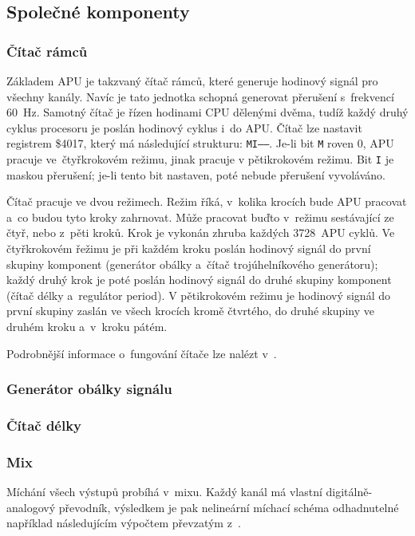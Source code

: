 \subsection{Společné komponenty}
\subsubsection{Čítač rámců}
\label{sec:analyza-citac-ramcu}
Základem APU je takzvaný čítač rámců, které generuje hodinový signál pro všechny kanály. Navíc je tato jednotka schopná generovat přerušení s~frekvencí 60~Hz. Samotný čítač je řízen hodinami CPU dělenými dvěma, tudíž každý druhý cyklus procesoru je poslán hodinový cyklus i~do APU. Čítač lze nastavit registrem \$4017, který má následující strukturu: \texttt{MI------}. Je-li bit \texttt{M} roven 0, APU pracuje ve~čtyřkrokovém režimu, jinak pracuje v pětikrokovém režimu. Bit \texttt{I} je maskou přerušení; je-li tento bit nastaven, poté nebude přerušení vyvoláváno.~\cite{Nesdev:apu-frame-counter}

Čítač pracuje ve dvou režimech. Režim říká, v~kolika krocích bude APU pracovat a~co budou tyto kroky zahrnovat. Může pracovat buďto v~režimu sestávající ze čtyř, nebo z~pěti kroků. Krok je vykonán zhruba každých 3728~APU cyklů. Ve čtyřkrokovém řežimu je při každém kroku poslán hodinový signál do první skupiny komponent (generátor obálky a~čítač trojúhelníkového generátoru); každý druhý krok je poté poslán hodinový signál do druhé skupiny komponent (čítač délky a~regulátor period). V pětikrokovém režimu je hodinový signál do první skupiny zaslán ve všech krocích kromě čtvrtého, do druhé skupiny ve druhém kroku a~v~kroku pátém.~\cite{Nesdev:apu-frame-counter}

Podrobnější informace o~fungování čítače lze nalézt v~\cite{Nesdev:apu-frame-counter}.

\subsubsection{Generátor obálky signálu}
\label{sec:analyza-generator-obalky}

\subsubsection{Čítač délky}
\label{sec:analyza-citac-delky}

\subsubsection{Mix}
Míchání všech výstupů probíhá v~mixu. Každý kanál má vlastní digitálně-analogový převodník, výsledkem je pak nelineární míchací schéma odhadnutelné například následujícím výpočtem převzatým z~\cite{Nesdev:apu-mixer}.


